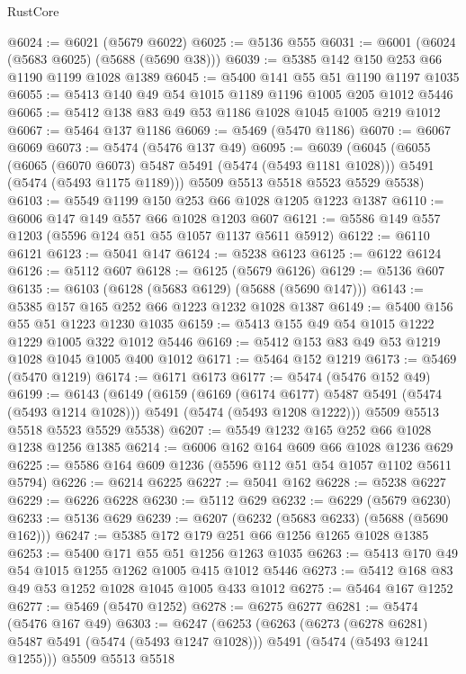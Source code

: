 \begin{lexlean}{RustCore}
\begin{coremodule}
@6024 := @6021 (@5679 @6022)
@6025 := @5136 @555
@6031 := @6001 (@6024 (@5683 @6025) (@5688 (@5690 @38)))
@6039 := @5385 @142 @150 @253 @66 @1190 @1199 @1028 @1389
@6045 := @5400 @141 @55 @51 @1190 @1197 @1035
@6055 := @5413 @140 @49 @54 @1015 @1189 @1196 @1005 @205 @1012 @5446
@6065 := @5412 @138 @83 @49 @53 @1186 @1028 @1045 @1005 @219 @1012
@6067 := @5464 @137 @1186
@6069 := @5469 (@5470 @1186)
@6070 := @6067 @6069
@6073 := @5474 (@5476 @137 @49)
@6095 := @6039
    (@6045
      (@6055
        (@6065 (@6070 @6073) @5487 @5491 (@5474 (@5493 @1181 @1028)))
        @5491
        (@5474 (@5493 @1175 @1189)))
      @5509
      @5513
      @5518
      @5523
      @5529
      @5538)
@6103 := @5549 @1199 @150 @253 @66 @1028 @1205 @1223 @1387
@6110 := @6006 @147 @149 @557 @66 @1028 @1203 @607
@6121 := @5586 @149 @557 @1203 (@5596 @124 @51 @55 @1057 @1137 @5611 @5912)
@6122 := @6110 @6121
@6123 := @5041 @147
@6124 := @5238 @6123
@6125 := @6122 @6124
@6126 := @5112 @607
@6128 := @6125 (@5679 @6126)
@6129 := @5136 @607
@6135 := @6103 (@6128 (@5683 @6129) (@5688 (@5690 @147)))
@6143 := @5385 @157 @165 @252 @66 @1223 @1232 @1028 @1387
@6149 := @5400 @156 @55 @51 @1223 @1230 @1035
@6159 := @5413 @155 @49 @54 @1015 @1222 @1229 @1005 @322 @1012 @5446
@6169 := @5412 @153 @83 @49 @53 @1219 @1028 @1045 @1005 @400 @1012
@6171 := @5464 @152 @1219
@6173 := @5469 (@5470 @1219)
@6174 := @6171 @6173
@6177 := @5474 (@5476 @152 @49)
@6199 := @6143
    (@6149
      (@6159
        (@6169 (@6174 @6177) @5487 @5491 (@5474 (@5493 @1214 @1028)))
        @5491
        (@5474 (@5493 @1208 @1222)))
      @5509
      @5513
      @5518
      @5523
      @5529
      @5538)
@6207 := @5549 @1232 @165 @252 @66 @1028 @1238 @1256 @1385
@6214 := @6006 @162 @164 @609 @66 @1028 @1236 @629
@6225 := @5586 @164 @609 @1236 (@5596 @112 @51 @54 @1057 @1102 @5611 @5794)
@6226 := @6214 @6225
@6227 := @5041 @162
@6228 := @5238 @6227
@6229 := @6226 @6228
@6230 := @5112 @629
@6232 := @6229 (@5679 @6230)
@6233 := @5136 @629
@6239 := @6207 (@6232 (@5683 @6233) (@5688 (@5690 @162)))
@6247 := @5385 @172 @179 @251 @66 @1256 @1265 @1028 @1385
@6253 := @5400 @171 @55 @51 @1256 @1263 @1035
@6263 := @5413 @170 @49 @54 @1015 @1255 @1262 @1005 @415 @1012 @5446
@6273 := @5412 @168 @83 @49 @53 @1252 @1028 @1045 @1005 @433 @1012
@6275 := @5464 @167 @1252
@6277 := @5469 (@5470 @1252)
@6278 := @6275 @6277
@6281 := @5474 (@5476 @167 @49)
@6303 := @6247
    (@6253
      (@6263
        (@6273 (@6278 @6281) @5487 @5491 (@5474 (@5493 @1247 @1028)))
        @5491
        (@5474 (@5493 @1241 @1255)))
      @5509
      @5513
      @5518

\end{coremodule}
\end{lexlean}
